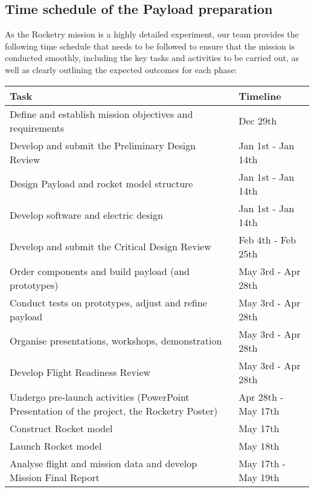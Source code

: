 \subsection{Time schedule of the Payload preparation}

As the Rocketry mission is a highly detailed experiment, our team provides the following time schedule that needs to be followed to ensure that the mission is conducted smoothly, including the key tasks and activities to be carried out, as well as clearly outlining the expected outcomes for each phase:

\begin{table}[H]
\centering
\begin{tabularx}{\textwidth}{|X|X|}
\hline
\textbf{Task} & \textbf{Timeline} \\ \hline
Define and establish mission objectives and requirements & Dec 29th \\ \hline
Develop and submit the Preliminary Design Review & Jan 1st - Jan 14th \\ \hline
Design Payload and rocket model structure & Jan 1st - Jan 14th \\ \hline
Develop software and electric design & Jan 1st - Jan 14th \\ \hline
Develop and submit the Critical Design Review & Feb 4th - Feb 25th \\  \hline
Order components and build payload (and prototypes) & May 3rd - Apr 28th \\ \hline
Conduct tests on prototypes, adjust and refine payload & May 3rd - Apr 28th \\ \hline
Organise presentations, workshops, demonstration & May 3rd - Apr 28th \\ \hline
Develop Flight Readiness Review & May 3rd - Apr 28th \\ \hline
Undergo pre-launch activities (PowerPoint Presentation of the project, the Rocketry Poster) & Apr 28th - May 17th \\ \hline
Construct Rocket model & May 17th \\ \hline
Launch Rocket model & May 18th \\ \hline
Analyse flight and mission data and develop Mission Final Report & May 17th - May 19th \\ \hline
\end{tabularx}
\end{table}


